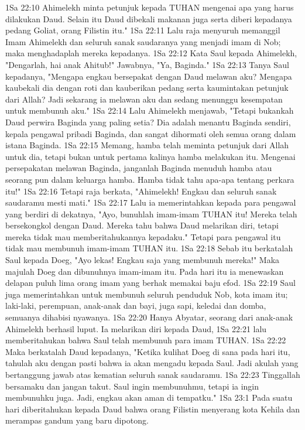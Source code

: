 1Sa 22:10  Ahimelekh minta petunjuk kepada TUHAN mengenai apa yang harus dilakukan Daud. Selain itu Daud dibekali makanan juga serta diberi kepadanya pedang Goliat, orang Filistin itu."
1Sa 22:11  Lalu raja menyuruh memanggil Imam Ahimelekh dan seluruh sanak saudaranya yang menjadi imam di Nob; maka menghadaplah mereka kepadanya.
1Sa 22:12  Kata Saul kepada Ahimelekh, "Dengarlah, hai anak Ahitub!" Jawabnya, "Ya, Baginda."
1Sa 22:13  Tanya Saul kepadanya, "Mengapa engkau bersepakat dengan Daud melawan aku? Mengapa kaubekali dia dengan roti dan kauberikan pedang serta kaumintakan petunjuk dari Allah? Jadi sekarang ia melawan aku dan sedang menunggu kesempatan untuk membunuh aku."
1Sa 22:14  Lalu Ahimelekh menjawab, "Tetapi bukankah Daud perwira Baginda yang paling setia? Dia adalah menantu Baginda sendiri, kepala pengawal pribadi Baginda, dan sangat dihormati oleh semua orang dalam istana Baginda.
1Sa 22:15  Memang, hamba telah meminta petunjuk dari Allah untuk dia, tetapi bukan untuk pertama kalinya hamba melakukan itu. Mengenai persepakatan melawan Baginda, janganlah Baginda menuduh hamba atau seorang pun dalam keluarga hamba. Hamba tidak tahu apa-apa tentang perkara itu!"
1Sa 22:16  Tetapi raja berkata, "Ahimelekh! Engkau dan seluruh sanak saudaramu mesti mati."
1Sa 22:17  Lalu ia memerintahkan kepada para pengawal yang berdiri di dekatnya, "Ayo, bunuhlah imam-imam TUHAN itu! Mereka telah bersekongkol dengan Daud. Mereka tahu bahwa Daud melarikan diri, tetapi mereka tidak mau memberitahukannya kepadaku." Tetapi para pengawal itu tidak mau membunuh imam-imam TUHAN itu.
1Sa 22:18  Sebab itu berkatalah Saul kepada Doeg, "Ayo lekas! Engkau saja yang membunuh mereka!" Maka majulah Doeg dan dibunuhnya imam-imam itu. Pada hari itu ia menewaskan delapan puluh lima orang imam yang berhak memakai baju efod.
1Sa 22:19  Saul juga memerintahkan untuk membunuh seluruh penduduk Nob, kota imam itu; laki-laki, perempuan, anak-anak dan bayi, juga sapi, keledai dan domba, semuanya dihabisi nyawanya.
1Sa 22:20  Hanya Abyatar, seorang dari anak-anak Ahimelekh berhasil luput. Ia melarikan diri kepada Daud,
1Sa 22:21  lalu memberitahukan bahwa Saul telah membunuh para imam TUHAN.
1Sa 22:22  Maka berkatalah Daud kepadanya, "Ketika kulihat Doeg di sana pada hari itu, tahulah aku dengan pasti bahwa ia akan mengadu kepada Saul. Jadi akulah yang bertanggung jawab atas kematian seluruh sanak saudaramu.
1Sa 22:23  Tinggallah bersamaku dan jangan takut. Saul ingin membunuhmu, tetapi ia ingin membunuhku juga. Jadi, engkau akan aman di tempatku."
1Sa 23:1  Pada suatu hari diberitahukan kepada Daud bahwa orang Filistin menyerang kota Kehila dan merampas gandum yang baru dipotong.
